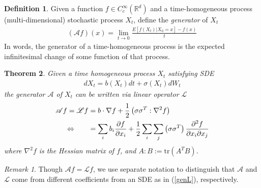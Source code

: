 \documentclass[12pt]{article}
\theoremstyle{plain}
\newtheorem{thm}{Theorem}[section]
\theoremstyle{definition}
\newtheorem{defn}[thm]{Definition}
\theoremstyle{remark}
\newtheorem*{rmk}{Remark}
\begin{document}
\begin{defn}
Given a function $f\in C_c^\infty(\mathbb{R}^d)$ and a time-homogeneous
process (multi-dimensional) stochastic process $X_t$, define the
\emph{generator} of $X_t$
\begin{align}
  (\mathscr{A}f)(x)=
  \lim_{t\rightarrow0} \frac{E[f(X_t)|X_0=x]-f(x)}{t}
  \label{genA}
\end{align}
In words, the generator of a time-homogeneous process is the
expected infinitesimal change of some function of that process.
\end{defn}

\begin{thm}
Given a time homogeneous process $X_t$ satisfying SDE
\begin{align*}
  dX_t = b(X_t) dt + \sigma(X_t) dW_t
\end{align*}
the generator $\mathscr{A}$ of $X_t$ can be written via linear operator
$\mathscr{L}$
\begin{align}
  \mathscr{A}f =
  \mathscr{L}f &= b \cdot \nabla f
  + \frac{1}{2} \left(\sigma \sigma^T:\nabla^2 f\right)\label{genL} \\
  \Leftrightarrow \qquad
  &= \sum_i b_i \frac{\partial f}{\partial x_i}
  + \frac{1}{2} \sum_i \sum_j \left(\sigma \sigma^T\right)
    \frac{\partial^2 f}{\partial x_i \partial x_j}\notag
\end{align}
where $\nabla^2 f$ is the Hessian matrix of $f$, and $A:B :=
\text{tr}(A^T B)$.
\end{thm}
\begin{rmk}
Though $\mathscr{A}f = \mathscr{L}f$, we use separate notation to
distinguish that $\mathscr{A}$ and $\mathscr{L}$ come from different
coefficients from an SDE as in (\ref{genL}), respectively.
\end{rmk}
\end{document}
